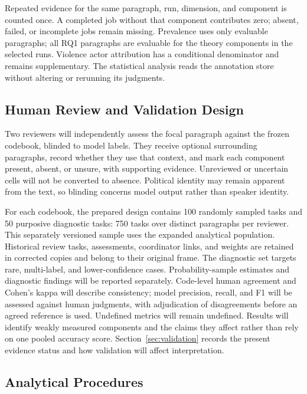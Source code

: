 \documentclass[sigconf,review,anonymous,balance=false]{acmart}
\begin{document}
Repeated evidence for the same paragraph, run, dimension, and component is counted
once. A completed job without that component contributes zero; absent, failed,
or incomplete jobs remain missing. Prevalence uses only evaluable paragraphs;
all \MainParagraphs{} RQ1 paragraphs are evaluable for the theory components in the selected
runs. Violence actor attribution has a conditional denominator and remains
supplementary. The statistical analysis reads the annotation store without
altering or rerunning its judgments.

\subsection{Human Review and Validation Design}
Two reviewers will independently assess the focal paragraph against the
frozen codebook, blinded to model labels. They receive optional surrounding
paragraphs, record whether they use that context, and mark each component present,
absent, or unsure, with supporting evidence. Unreviewed or uncertain cells
will not be converted to absence. Political identity may remain apparent
from the text, so blinding concerns model output rather than speaker identity.

For each codebook, the prepared design contains 100 randomly sampled tasks
and 50 purposive diagnostic tasks: 750 tasks over \ReviewUniqueParagraphs{} distinct paragraphs
per reviewer. This separately versioned sample uses the expanded analytical
population. Historical review tasks, assessments, coordinator links, and
weights are retained in corrected copies and belong to their original frame. The diagnostic set targets rare, multi-label, and
lower-confidence cases. Probability-sample estimates and diagnostic findings
will be reported separately. Code-level human agreement and Cohen's kappa
will describe consistency; model precision, recall, and F1 will be assessed
against human judgments, with adjudication of disagreements before an
agreed reference is used. Undefined metrics will remain undefined.
Results will identify weakly measured components and the claims they affect rather than
rely on one pooled accuracy score. Section~\ref{sec:validation} records
the present evidence status and how validation will affect interpretation.

\subsection{Analytical Procedures}
\end{document}
